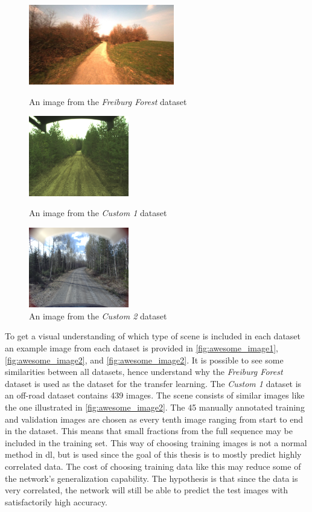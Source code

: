 \documentclass[USenglish]{ifimaster}  %
\begin{document}
\begin{figure}[ht]
  \includegraphics[width=\linewidth, height=3.5cm]{bilder/freiburg.png}
  \caption{An image from the \textit{Freiburg Forest} dataset}\label{fig:awesome_image1}
\endminipage\hfill
{}
  \includegraphics[width=\linewidth, height=3.5cm]{bilder/custom_1.png}
  \caption{An image from the \textit{Custom 1} dataset}\label{fig:awesome_image2}
\endminipage\hfill
{}%
  \includegraphics[width=\linewidth, height=3.5cm]{bilder/custom_2.png}
  \caption{An image from the \textit{Custom 2} dataset}\label{fig:awesome_image3}
\endminipage
\end{figure}

To get a visual understanding of which type of scene is included in each dataset an example image from each dataset is provided in \cref{fig:awesome_image1}, \cref{fig:awesome_image2}, and \cref{fig:awesome_image2}. It is possible to see some similarities between all datasets, hence understand why the \textit{Freiburg Forest} dataset is used as the dataset for the transfer learning. The \textit{Custom 1} dataset is an off-road dataset contains 439 images. The scene consists of similar images like the one illustrated in \cref{fig:awesome_image2}. The 45 manually annotated training and validation images are chosen as every tenth image ranging from start to end in the dataset. This means that small fractions from the full sequence may be included in the training set. This way of choosing training images is not a normal method in \ac{dl}, but is used since the goal of this thesis is to mostly predict highly correlated data. The cost of choosing training data like this may reduce some of the network's generalization capability. The hypothesis is that since the data is very correlated, the network will still be able to predict the test images with satisfactorily high accuracy. 
\end{document}
